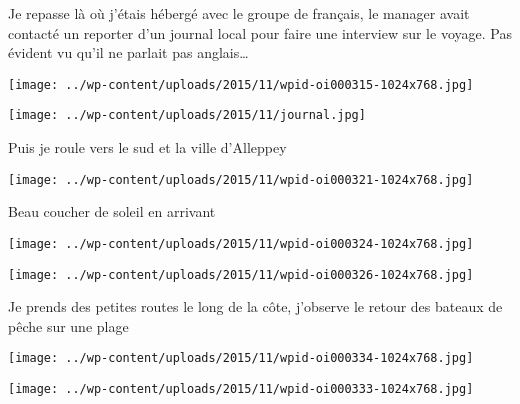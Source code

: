  

 Je repasse là où j'étais hébergé avec le groupe de français, le manager avait contacté un reporter d'un journal local pour faire une interview sur le voyage. Pas évident vu qu'il ne parlait pas anglais… 

 

\begin{center} \texttt{[image: ../wp-content/uploads/2015/11/wpid-oi000315-1024x768.jpg]} \end{center}

\begin{center} \texttt{[image: ../wp-content/uploads/2015/11/journal.jpg]} \end{center}

 

 Puis je roule vers le sud et la ville d'Alleppey 

 

\begin{center} \texttt{[image: ../wp-content/uploads/2015/11/wpid-oi000321-1024x768.jpg]} \end{center}

 

 Beau coucher de soleil en arrivant 

 

\begin{center} \texttt{[image: ../wp-content/uploads/2015/11/wpid-oi000324-1024x768.jpg]} \end{center}

 

 

\begin{center} \texttt{[image: ../wp-content/uploads/2015/11/wpid-oi000326-1024x768.jpg]} \end{center}

 

 Je prends des petites routes le long de la côte, j'observe le retour des bateaux de pêche sur une plage 

 

\begin{center} \texttt{[image: ../wp-content/uploads/2015/11/wpid-oi000334-1024x768.jpg]} \end{center}

 

 

\begin{center} \texttt{[image: ../wp-content/uploads/2015/11/wpid-oi000333-1024x768.jpg]} \end{center}

